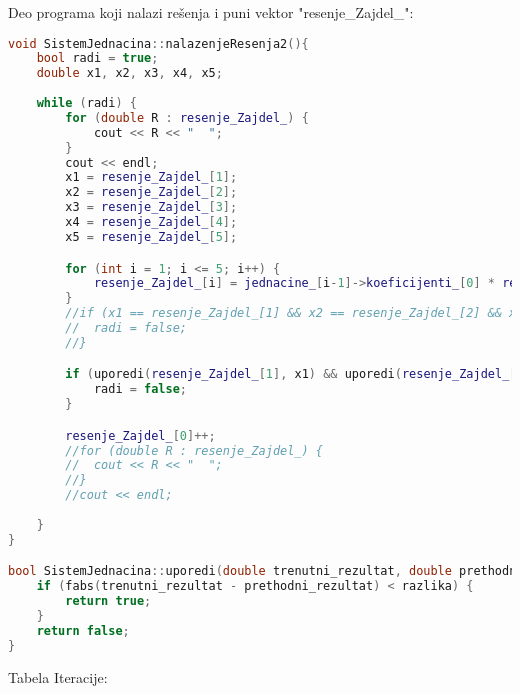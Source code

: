\documentclass[12pt,leqno,a4paper]{article}
\begin{document}
Deo programa koji nalazi re\v senja i puni vektor "resenje\_Zajdel\_":

\begin{lstlisting}[language=C++ ]
void SistemJednacina::nalazenjeResenja2(){
	bool radi = true;
	double x1, x2, x3, x4, x5;
	
	while (radi) {
		for (double R : resenje_Zajdel_) {
			cout << R << "  ";
		}
		cout << endl;
		x1 = resenje_Zajdel_[1];
		x2 = resenje_Zajdel_[2];
		x3 = resenje_Zajdel_[3];
		x4 = resenje_Zajdel_[4];
		x5 = resenje_Zajdel_[5];

		for (int i = 1; i <= 5; i++) {
			resenje_Zajdel_[i] = jednacine_[i-1]->koeficijenti_[0] * resenje_Zajdel_[1] + jednacine_[i - 1]->koeficijenti_[1] * resenje_Zajdel_[2] + jednacine_[i - 1]->koeficijenti_[2] * resenje_Zajdel_[3] + jednacine_[i - 1]->koeficijenti_[3] * resenje_Zajdel_[4] + jednacine_[i - 1]->koeficijenti_[4] * resenje_Zajdel_[5] + jednacine_[i - 1]->koeficijenti_[5];
		}
		//if (x1 == resenje_Zajdel_[1] && x2 == resenje_Zajdel_[2] && x3 == resenje_Zajdel_[3] && x4 == resenje_Zajdel_[4] && x5 == resenje_Zajdel_[5]) {
		//	radi = false;
		//}

		if (uporedi(resenje_Zajdel_[1], x1) && uporedi(resenje_Zajdel_[2], x2) && uporedi(resenje_Zajdel_[3], x3) && uporedi(resenje_Zajdel_[4], x4) && uporedi(resenje_Zajdel_[5], x5)) {
			radi = false;
		}

		resenje_Zajdel_[0]++;
		//for (double R : resenje_Zajdel_) {
		//	cout << R << "  ";
		//}
		//cout << endl;
	
	}
}

bool SistemJednacina::uporedi(double trenutni_rezultat, double prethodni_rezultat, double razlika){
	if (fabs(trenutni_rezultat - prethodni_rezultat) < razlika) {
		return true;
	}
	return false;
}
\end{lstlisting}

Tabela Iteracije:
\end{document}
